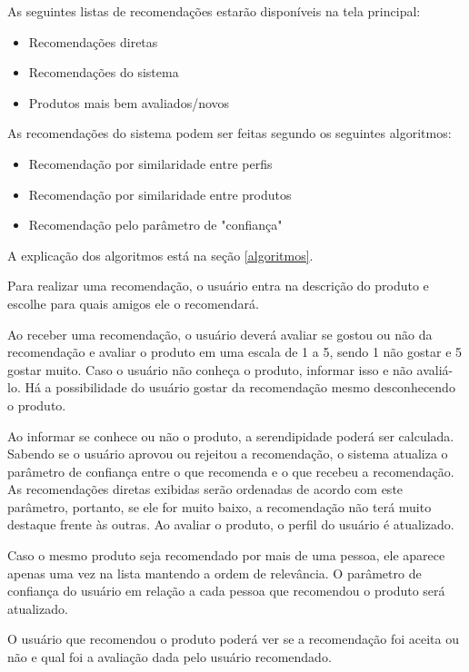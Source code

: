 \documentclass[a4paper,12pt]{article}
\begin{document}
As seguintes listas de recomendações estarão disponíveis na tela principal:

\begin{itemize}
    \item Recomendações diretas
    \item Recomendações do sistema
    \item Produtos mais bem avaliados/novos
\end{itemize}

As recomendações do sistema podem ser feitas segundo os seguintes algoritmos:

\begin{itemize}
    \item Recomendação por similaridade entre perfis
    \item Recomendação por similaridade entre produtos
    \item Recomendação pelo parâmetro de "confiança"
\end{itemize}

A explicação dos algoritmos está na seção \ref{algoritmos}.

Para realizar uma recomendação, o usuário entra na descrição do produto e escolhe para quais amigos ele o recomendará.

Ao receber uma recomendação, o usuário deverá avaliar se gostou ou não da recomendação e avaliar o produto em uma escala de 1 a 5, sendo 1 não gostar e 5 gostar muito. Caso o usuário não conheça o produto, informar isso e não avaliá-lo. Há a possibilidade do usuário gostar da recomendação mesmo desconhecendo o produto.

Ao informar se conhece ou não o produto, a serendipidade poderá ser calculada. Sabendo se o usuário aprovou ou rejeitou a recomendação, o sistema atualiza o parâmetro de confiança entre o que recomenda e o que recebeu a recomendação. As recomendações diretas exibidas serão ordenadas de acordo com este parâmetro, portanto, se ele for muito baixo, a recomendação não terá muito destaque frente às outras. Ao avaliar o produto, o perfil do usuário é atualizado.

Caso o mesmo produto seja recomendado por mais de uma pessoa, ele aparece apenas uma vez na lista mantendo a ordem de relevância. O parâmetro de confiança do usuário em relação a cada pessoa que recomendou o produto será atualizado.

O usuário que recomendou o produto poderá ver se a recomendação foi aceita ou não e qual foi a avaliação dada pelo usuário recomendado.
\end{document}
